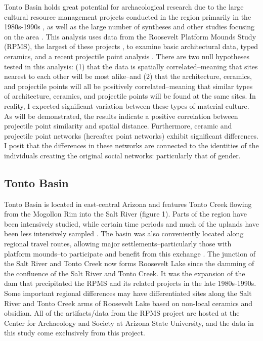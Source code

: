\documentclass[]{interact}
\theoremstyle{plain}%
\theoremstyle{definition}
\theoremstyle{remark}
\begin{document}
Tonto Basin holds great potential for archaeological research due to the
large cultural resource management projects conducted in the region
primarily in the 1980s-1990s
\citep{Ahlstrom1991-eb, Ciolek-Torrello1994-ds, Doelle1992-lu, Rice1998-ku},
as well as the large number of syntheses and other studies focusing on
the area
\citep[e.g.,][]{Clark2004-uw, Dean2000-uc, Elson1995-tb, Elson2000-zq, Hill2015-at, Huntley2016-em, Lange1992-gp, Lyons2003-yy, Lyons2006-to, Lyons2012-pr, Neuzil2008-zd, Oliver2001-tu, Stark1998-mu, Watts2013-ub}.
This analysis uses data from the Roosevelt Platform Mounds Study (RPMS),
the largest of these projects \citep{Rice1998-ku}, to examine basic
architectural data, typed ceramics, and a recent projectile point
analysis \citep{Bischoff2022-rg}. There are two null hypotheses tested
in this analysis: (1) that the data is spatially correlated--meaning
that sites nearest to each other will be most alike--and (2) that the
architecture, ceramics, and projectile points will all be positively
correlated--meaning that similar types of architecture, ceramics, and
projectile points will be found at the same sites. In reality, I
expected significant variation between these types of material culture.
As will be demonstrated, the results indicate a positive correlation
between projectile point similarity and spatial distance. Furthermore,
ceramic and projectile point networks (hereafter point networks) exhibit
significant differences. I posit that the differences in these networks
are connected to the identities of the individuals creating the original
social networks: particularly that of gender.

\hypertarget{tonto-basin}{%
\subsection{Tonto Basin}\label{tonto-basin}}

Tonto Basin is located in east-central Arizona and features Tonto Creek
flowing from the Mogollon Rim into the Salt River (figure 1). Parts of
the region have been intensively studied, while certain time periods and
much of the uplands have been less intensively sampled \citep[see][ for
a recent overview]{Clark2021-lu}. The basin was also conveniently
located along regional travel routes, allowing major
settlements--particularly those with platform mounds--to participate and
benefit from this exchange
\citep[p.~129-133]{Caseldine2022-uu, Wood2000-ze}. The junction of the
Salt River and Tonto Creek now forms Roosevelt Lake since the damming of
the confluence of the Salt River and Tonto Creek. It was the expansion
of the dam that precipitated the RPMS and its related projects in the
late 1980s-1990s. Some important regional differences may have
differentiated sites along the Salt River and Tonto Creek arms of
Roosevelt Lake \citep{Lyons2013-ya, Simon2001-am} based on non-local
ceramics and obsidian. All of the artifacts/data from the RPMS project
are hosted at the Center for Archaeology and Society at Arizona State
University, and the data in this study come exclusively from this
project.
\end{document}
